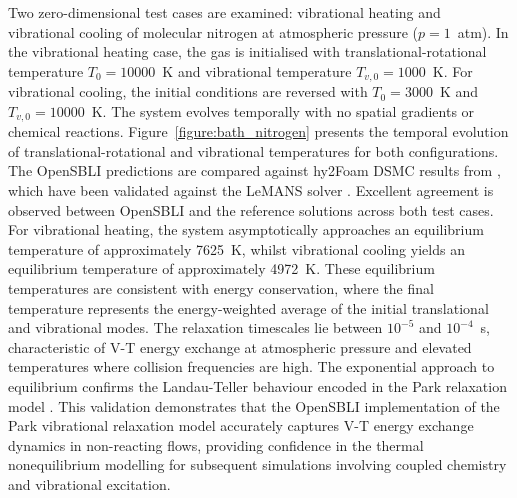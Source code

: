 Two zero-dimensional test cases are examined: vibrational heating and vibrational cooling of molecular nitrogen at atmospheric pressure ($p = 1$~atm). In the vibrational heating case, the gas is initialised with translational-rotational temperature $T_0 = 10000$~K and vibrational temperature $T_{v,0} = 1000$~K. For vibrational cooling, the initial conditions are reversed with $T_0 = 3000$~K and $T_{v,0} = 10000$~K. The system evolves temporally with no spatial gradients or chemical reactions. Figure~\ref{figure:bath_nitrogen} presents the temporal evolution of translational-rotational and vibrational temperatures for both configurations. The OpenSBLI predictions are compared against hy2Foam DSMC results from \citet{Casseau2016a}, which have been validated against the LeMANS solver \citep{Scalabrin2005}. Excellent agreement is observed between OpenSBLI and the reference solutions across both test cases. For vibrational heating, the system asymptotically approaches an equilibrium temperature of approximately 7625~K, whilst vibrational cooling yields an equilibrium temperature of approximately 4972~K. These equilibrium temperatures are consistent with energy conservation, where the final temperature represents the energy-weighted average of the initial translational and vibrational modes. The relaxation timescales lie between $10^{-5}$ and $10^{-4}$~s, characteristic of V-T energy exchange at atmospheric pressure and elevated temperatures where collision frequencies are high. The exponential approach to equilibrium confirms the Landau-Teller behaviour encoded in the Park relaxation model \citep{Park1993}. This validation demonstrates that the OpenSBLI implementation of the Park vibrational relaxation model accurately captures V-T energy exchange dynamics in non-reacting flows, providing confidence in the thermal nonequilibrium modelling for subsequent simulations involving coupled chemistry and vibrational excitation.






